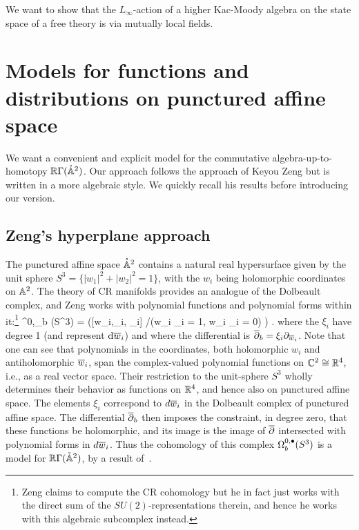 \documentclass[11pt]{amsart}
\def\del{\partial}
\def\C{{\mathbb{C}}}
\begin{document}
We want to show that the $L_\infty$-action of a higher Kac-Moody algebra on the state space of a free theory is via mutually local fields.

\newpage

\section{Models for functions and distributions on punctured affine space}

We want a convenient and explicit model for the commutative algebra-up-to-homotopy $\RR \Gamma(\mathring{\AA}^2)$.
Our approach follows the approach of Keyou Zeng but is written in a more algebraic style.
We quickly recall his results before introducing our version.

\subsection{Zeng's hyperplane approach}

The punctured affine space $\mathring{\AA}^2$ contains a natural real hypersurface given by the unit sphere $S^3 = \{|w_1|^2 + |w_2|^2 = 1\}$, with the $w_i$ being holomorphic coordinates on $\AA^2$.
The theory of CR manifolds provides an analogue of the Dolbeault complex, 
and Zeng works with polynomial functions and polynomial forms within it:\footnote{Zeng claims to compute the CR cohomology but he in fact just works with the direct sum of the $SU(2)$-representations therein, and hence he works with this algebraic subcomplex instead.}
\beqn
\Omega^{0,\bu}_b (S^3) = \big(\C[w_i,_i, \xi_i] \slash (w_i _i = 1, w_i \xi_i = 0) \big) .
\eeqn
where the $\xi_i$ have degree 1 (and represent $\d \Bar{w}_i$) and where the differential is $\dbar_b = \xi_i \del_{\Bar{w}_i}$.
Note that one can see that polynomials in the coordinates, both holomorphic $w_i$ and antiholomorphic $\Bar{w}_i$, span the complex-valued polynomial functions on $\CC^2 \cong \RR^4$, i.e., as a real vector space.
Their restriction to the unit-sphere $S^3$ wholly determines their behavior as functions on $\RR^4$, and hence also on punctured affine space. 
The elements $\xi_i$ correspond to $d\Bar{w}_i$ in the Dolbeault complex of punctured affine space.
The differential $\dbar_b$ then imposes the constraint, in degree zero, that these functions be holomorphic,
and its image is the image of $\dbar$ intersected with polynomial  forms in $d \Bar{w}_i$.
Thus the cohomology of this complex $\Omega^{0,\bu}_b (S^3)$ is a model for $\RR \Gamma(\mathring{\AA}^2)$, by a result of~\cite{FHK}.
\end{document}

